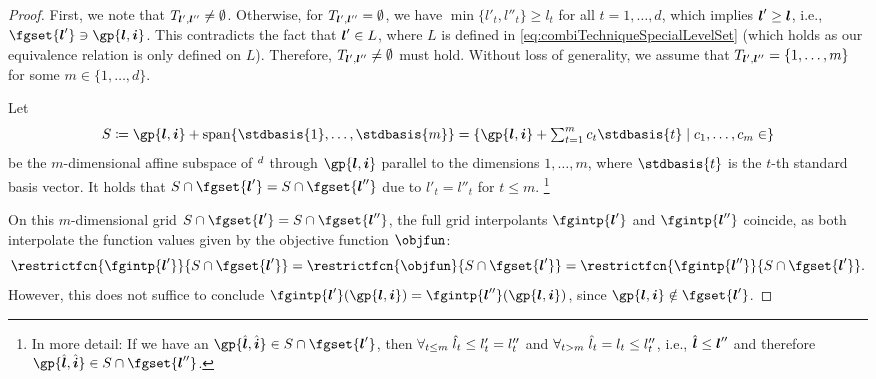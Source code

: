 \begin{proof}
  First, we note that $T_{{\boldsymbol{l}}',{\boldsymbol{l}}''} \not= \emptyset$.
  Otherwise, for $T_{{\boldsymbol{l}}',{\boldsymbol{l}}''} = \emptyset$,
  we have $\min\{l'_t, l''_t\} \ge l_t$
  for all $t = 1, \dotsc, d$, which implies ${\boldsymbol{l}}' \ge {\boldsymbol{l}}$, i.e.,
  $\fgset{\*l'} \ni \gp{\*l,\*i}$.
  This contradicts the fact that ${\boldsymbol{l}}' \in L$, where $L$ is defined
  in \eqref{eq:combiTechniqueSpecialLevelSet}
  (which holds as our equivalence relation is only defined on $L$).
  Therefore, $T_{{\boldsymbol{l}}',{\boldsymbol{l}}''} \not= \emptyset$ must hold.
  Without loss of generality,
  we assume that $T_{{\boldsymbol{l}}',{\boldsymbol{l}}''} = \{1, \dotsc, m\}$
  for some $m \in \{1, \dotsc, d\}$.
  
  Let
  \begin{equation}
    S \ceq \gp{\*l,\*i} + \spn\{\stdbasis{1}, \dotsc, \stdbasis{m}\}
    = \{\gp{\*l,\*i} + \textstyle\sum_{t=1}^m c_t \stdbasis{t} \mid
    c_1, \dotsc, c_m \in \real\}
  \end{equation}
  be the $m$-dimensional affine subspace of $\real^d$
  through $\gp{\*l, \*i}$
  parallel to the dimensions $1, \dotsc, m$,
  where $\stdbasis{t}$ is the $t$-th standard basis vector.
  It holds that $S \cap \fgset{\*l'} = S \cap \fgset{\*l''}$ due to
  $l'_t = l''_t$ for $t \le m$.%
  \footnote{%
    In more detail:
    If we have an $\gp{\hat{\*l},\hat{\*i}} \in S \cap \fgset{\*l'}$,
    then $\forall_{t \le m}\;\hat{l}_t \le l'_t = l''_t$ and
    $\forall_{t > m}\;\hat{l}_t = l_t \le l''_t$, i.e.,
    $\hat{{\boldsymbol{l}}} \le {\boldsymbol{l}}''$ and therefore
    $\gp{\hat{\*l},\hat{\*i}} \in S \cap \fgset{\*l''}$.%
  }
  
  On this $m$-dimensional grid $S \cap \fgset{\*l'} = S \cap \fgset{\*l''}$,
  the full grid interpolants $\fgintp{\*l'}$ and $\fgintp{\*l''}$
  coincide, as both interpolate the function values given by
  the objective function $\objfun$:
  \begin{equation}
    \label{eq:proofCombiTechniqueIdenticalValues1}
    \restrictfcn{\fgintp{\*l'}}{S \cap \fgset{\*l'}}
    = \restrictfcn{\objfun}{S \cap \fgset{\*l'}}
    =  \restrictfcn{\fgintp{\*l''}}{S \cap \fgset{\*l'}}.
  \end{equation}
  However, this does not suffice to conclude
  $\fgintp{\*l'}(\gp{\*l,\*i}) = \fgintp{\*l''}(\gp{\*l,\*i})$,
  since $\gp{\*l,\*i} \notin \fgset{\*l'}$.
  

\end{proof}

